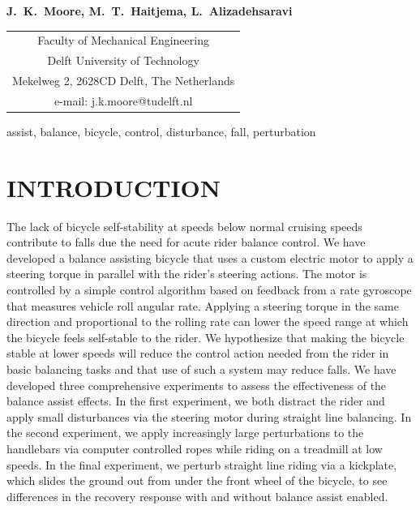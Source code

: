 \documentclass{icsc}
\begin{document}
\begin{center}
\end{center}

\begin{center}
  \normalsize{\bf{J.~K.~Moore,
                  M.~T.~Haitjema,
                  L.~Alizadehsaravi}}
\end{center}

\begin{center}
  \begin{tabular}{c}
    Faculty of Mechanical Engineering\\
    Delft University of Technology\\
    Mekelweg 2, 2628CD Delft, The Netherlands\\
    e-mail: j.k.moore@tudelft.nl\\
  \end{tabular}
\end{center}

\begin{keywords}
  assist,
  balance,
  bicycle,
  control,
  disturbance,
  fall,
  perturbation
\end{keywords}

\section{INTRODUCTION}
%
The lack of bicycle self-stability at speeds below normal cruising speeds
contribute to falls due the need for acute rider balance control. We have
developed a balance assisting bicycle that uses a custom electric motor to
apply a steering torque in parallel with the rider's steering actions. The
motor is controlled by a simple control algorithm based on feedback from a rate
gyroscope that measures vehicle roll angular rate. Applying a steering torque
in the same direction and proportional to the rolling rate can lower the speed
range at which the bicycle feels self-stable to the rider. We hypothesize that
making the bicycle stable at lower speeds will reduce the control action needed
from the rider in basic balancing tasks and that use of such a system may
reduce falls. We have developed three comprehensive experiments to assess the
effectiveness of the balance assist effects. In the first experiment, we both
distract the rider and apply small disturbances via the steering motor during
straight line balancing. In the second experiment, we apply increasingly large
perturbations to the handlebars via computer controlled ropes while riding on a
treadmill at low speeds. In the final experiment, we perturb straight line
riding via a kickplate, which slides the ground out from under the front wheel
of the bicycle, to see differences in the recovery response with and without
balance assist enabled.
\end{document}
